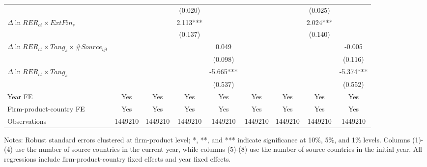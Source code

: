 \begin{table}
{\begin{threeparttable}
\begin{tabular}{lcccccccc}
			&   &       & (0.020) &       &       &       & (0.025) &  \\
			$\Delta \ln RER_{ct} \times ExtFin_{s}$ &     &       & 2.113*** &       &       &       & 2.024*** &  \\
			&   &       & (0.137) &       &       &       & (0.140) &  \\
			$\Delta \ln RER_{ct} \times Tang_{s} \times \#Source_{ijt}$ &    &       &       & 0.049 &       &       &       & -0.005 \\
			&    &       &       & (0.098) &       &       &       & (0.116) \\
			$\Delta \ln RER_{ct} \times Tang_{s}$ &   &       &       & -5.665*** &       &       &       & -5.374*** \\
			&  &       &       & (0.537) &       &       &       & (0.552) \\
                \midrule
			Year FE  & Yes   & Yes   & Yes   & Yes & Yes   & Yes   & Yes   & Yes\\
			Firm-product-country FE & Yes   & Yes   & Yes   & Yes & Yes   & Yes   & Yes   & Yes\\
			Observations & 1449210 & 1449210 & 1449210 & 1449210 & 1449210 & 1449210 & 1449210 & 1449210\\
			\bottomrule
		\end{tabular}
		\begin{tablenotes}
			\footnotesize
			\item Notes: Robust standard errors clustered at firm-product level; *, **, and *** indicate significance at 10\%, 5\%, and 1\% levels. Columns (1)-(4) use the number of source countries in the current year, while columns (5)-(8) use the number of source countries in the initial year. All regressions include firm-product-country fixed effects and year fixed effects.
		\end{tablenotes}
	\end{threeparttable}
	}
	\label{tab.source}
\end{table}


